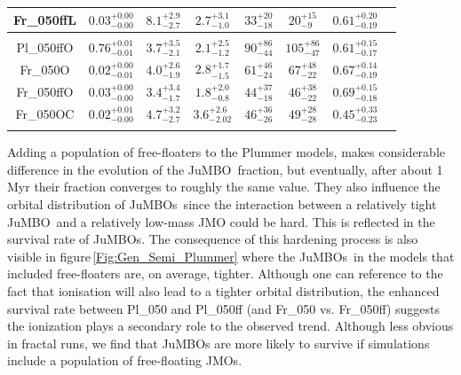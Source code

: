 \documentclass[submission,phys]{lib/SciPost}
\newcommand{\jumbo}{\mbox{JuMBO}}
\newcommand{\jumbos}{\mbox{JuMBOs}}
\begin{document}
\begin{table}
\begin{tabular}{c c c c c c c c}
           Fr\_050ffL  & $0.03^{+0.00}_{-0.00}$ & $8.1^{+2.9}_{-2.7}$ & $2.7^{+3.1}_{-1.0}$ & $33^{+20}_{-18}$ & $20^{+15}_{-9}$ & $0.61^{+0.20}_{-0.19}$ \vspace{0.25em}\\
           \hline \vspace{-0.75em}\\
           Pl\_050ffO  & $0.76^{+0.01}_{-0.01}$ & $3.7^{+3.5}_{-2.1}$ & $2.1^{+2.5}_{-1.2}$ & $90^{+86}_{-44}$ & $105^{+86}_{-47}$ & $0.61^{+0.15}_{-0.17}$ \vspace{0.25em}\\
           Fr\_050O    & $0.02^{+0.00}_{-0.01}$ & $4.0^{+2.6}_{-1.9}$ & $2.8^{+1.7}_{-1.5}$ & $61^{+46}_{-24}$ & $67^{+48}_{-22}$ & $0.67^{+0.14}_{-0.19}$ \vspace{0.25em}\\
           Fr\_050ffO  & $0.03^{+0.00}_{-0.00}$ & $3.4^{+3.4}_{-1.7}$ & $1.8^{+2.0}_{-0.8}$ & $44^{+37}_{-18}$ & $46^{+38}_{-22}$ & $0.69^{+0.15}_{-0.18}$ \vspace{0.25em}\\
           Fr\_050OC   & $0.02^{+0.01}_{-0.00}$ & $4.7^{+3.2}_{-2.7}$ & $3.6^{+2.6}_{-2.02}$ & $46^{+36}_{-26}$ & $49^{+28}_{-28}$ & $0.45^{+0.33}_{-0.23}$ \vspace{0.25em}\\
           \hline
         \hline                                   %
         \label{Tab:Final_ISF_FFC_Results}
        \end{tabular}
     \end{table}

Adding a population of free-floaters to the Plummer models, makes
considerable difference in the evolution of the \jumbo\, fraction, but
eventually, after about 1\,Myr their fraction converges to roughly the
same value.  They also influence the orbital distribution of \jumbos\,
since the interaction between a relatively tight \jumbo\, and a
relatively low-mass JMO could be hard. This is reflected in the
survival rate of \jumbos. The consequence of this hardening process is
also visible in figure\,\ref{Fig:Gen_Semi_Plummer} where the \jumbos\,
in the models that included free-floaters are, on average,
tighter. Although one can reference to the fact that ionisation will
also lead to a tighter orbital distribution, the enhanced survival
rate between Pl\_050 and Pl\_050ff (and Fr\_050 vs.  Fr\_050ff)
suggests the ionization plays a secondary role to the observed trend.
Although less obvious in fractal runs, we find that JuMBOs are more
likely to survive if simulations include a population of free-floating
JMOs.
\end{document}
